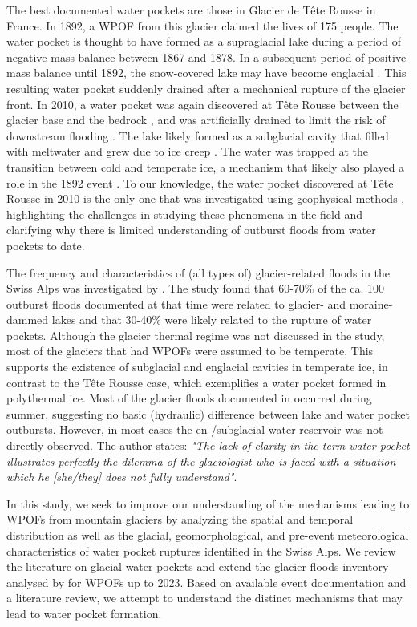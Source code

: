 The best documented water pockets are those in Glacier de Tête Rousse in France. In 1892, a WPOF from this glacier claimed the lives of 175 people. The water pocket is thought to have formed as a supraglacial lake during a period of negative mass balance between 1867 and 1878. In a subsequent period of positive mass balance until 1892, the snow-covered lake may have become englacial \citep{Vincent&al2010b}. This resulting water pocket suddenly drained after a mechanical rupture of the glacier front. In 2010, a water pocket was again discovered at Tête Rousse between the glacier base and the bedrock \citep{Vincent&al2012,Legchenko&2014,Garambois&al2016}, and was artificially drained to limit the risk of downstream flooding \citep{Vincent&al2012}. The lake likely formed as a subglacial cavity that filled with meltwater and grew due to ice creep \citep{Vincent&al2015}. The water was trapped at the transition between cold and temperate ice, a mechanism that likely also played a role in the 1892 event \citep{Gilbert&al2012}. To our knowledge, the water pocket discovered at Tête Rousse in 2010 is the only one that was investigated using geophysical methods \citep{Vincent&al2012, Legchenko&2014}, highlighting the challenges in studying these phenomena in the field and clarifying why there is limited understanding of outburst floods from water pockets to date. 

The frequency and characteristics of (all types of) glacier-related floods in the Swiss Alps was investigated by \cite{Haeberli1983}. The study found that 60-70\% of the ca. 100 outburst floods documented at that time were related to glacier- and moraine-dammed lakes and that 30-40\% were likely related to the rupture of water pockets. Although the glacier thermal regime was not discussed in the study, most of the glaciers that had WPOFs were assumed to be temperate. This supports the existence of subglacial and englacial cavities in temperate ice, in contrast to the Tête Rousse case, which exemplifies a water pocket formed in polythermal ice. Most of the glacier floods documented in \cite{Haeberli1983} occurred during summer, suggesting no basic (hydraulic) difference between lake and water pocket outbursts. However, in most cases the en-/subglacial water reservoir was not directly observed. The author states: \textit{"The lack of clarity in the term water pocket illustrates perfectly the dilemma of the glaciologist who is faced with a situation which he [she/they] does not fully understand"}. 

In this study, we seek to improve our understanding of the mechanisms leading to WPOFs from mountain glaciers by analyzing the spatial and temporal distribution as well as the glacial, geomorphological, and pre-event meteorological characteristics of water pocket ruptures identified in the Swiss Alps. We review the literature on glacial water pockets and extend the glacier floods inventory analysed by \citet{Haeberli1983} for WPOFs up to 2023. Based on available event documentation and a literature review, we attempt to understand the distinct mechanisms that may lead to water pocket formation. 


